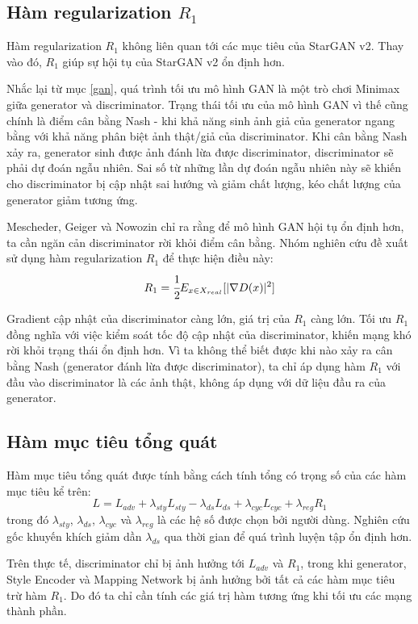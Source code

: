 \documentclass[12pt]{extreport}
\begin{document}
\subsection{Hàm regularization $ R_1 $}

Hàm regularization $ R_1 $ không liên quan tới các mục tiêu của StarGAN v2. Thay vào đó, $ R_1 $ giúp sự hội tụ của StarGAN v2 ổn định hơn.

Nhắc lại từ mục \ref{gan}, quá trình tối ưu mô hình GAN là một trò chơi Minimax giữa generator và discriminator. Trạng thái tối ưu của mô hình GAN vì thế cũng chính là điểm cân bằng Nash - khi khả năng sinh ảnh giả của generator ngang bằng với khả năng phân biệt ảnh thật/giả của discriminator. Khi cân bằng Nash xảy ra, generator sinh được ảnh đánh lừa được discriminator, discriminator sẽ phải dự đoán ngẫu nhiên. Sai số từ những lần dự đoán ngẫu nhiên này sẽ khiến cho discriminator bị cập nhật sai hướng và giảm chất lượng, kéo chất lượng của generator giảm tương ứng.

Mescheder, Geiger và Nowozin \cite{DBLP:journals/corr/abs-1801-04406} chỉ ra rằng để mô hình GAN hội tụ ổn định hơn, ta cần ngăn cản discriminator rời khỏi điểm cân bằng. Nhóm nghiên cứu đề xuất sử dụng hàm regularization $ R_1 $ để thực hiện điều này:
$$ R_1 = \cfrac{1}{2} E_{x \in X_{real}}[|\nabla D(x)|^2] $$

Gradient cập nhật của discriminator càng lớn, giá trị của $ R_1 $ càng lớn. Tối ưu $ R_1 $ đồng nghĩa với việc kiểm soát tốc độ cập nhật của discriminator, khiến mạng khó rời khỏi trạng thái ổn định hơn.  Vì ta không thể biết được khi nào xảy ra cân bằng Nash (generator đánh lừa được discriminator), ta chỉ áp dụng hàm $ R_1 $ với đầu vào discriminator là các ảnh thật, không áp dụng với dữ liệu đầu ra của generator.

\subsection{Hàm mục tiêu tổng quát}

Hàm mục tiêu tổng quát được tính bằng cách tính tổng có trọng số của các hàm mục tiêu kể trên:
$$ L = L_{adv} + \lambda_{sty} L_{sty} - \lambda_{ds} L_{ds} + \lambda_{cyc} L_{cyc} + \lambda_{reg} R_1  $$
trong đó $ \lambda_{sty} $, $ \lambda_{ds} $, $ \lambda_{cyc} $ và $ \lambda_{reg} $ là các hệ số được chọn bởi người dùng. Nghiên cứu gốc khuyến khích giảm dần $ \lambda_{ds} $ qua thời gian để quá trình luyện tập ổn định hơn.

Trên thực tế, discriminator chỉ bị ảnh hưởng tới $ L_{adv} $ và $ R_1 $, trong khi generator, Style Encoder và Mapping Network bị ảnh hưởng bởi tất cả các hàm mục tiêu trừ hàm $ R_1 $. Do đó ta chỉ cần tính các giá trị hàm tương ứng khi tối ưu các mạng thành phần.
\end{document}

